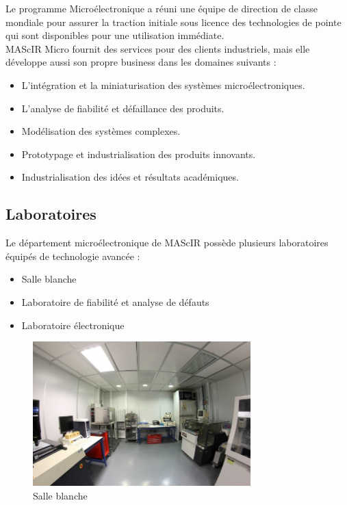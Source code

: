 \documentclass[11pt, a4paper, twoside]{book}
\begin{document}
Le programme Microélectronique a réuni une équipe de direction de classe mondiale pour assurer la traction initiale sous licence des technologies de pointe qui sont disponibles pour une utilisation immédiate. \\

MAScIR Micro fournit des services pour des clients industriels, mais elle développe aussi son propre business dans les domaines suivants :
\begin{itemize}
\item L’intégration et la miniaturisation des systèmes microélectroniques.
\item L’analyse de fiabilité et défaillance des produits.
\item Modélisation des systèmes complexes.
\item Prototypage et industrialisation des produits innovants.
\item Industrialisation des idées et résultats académiques.
\end{itemize}

\subsection{Laboratoires}
Le département microélectronique de MAScIR possède plusieurs laboratoires équipés de technologie avancée :
\begin{itemize}
\item Salle blanche
\item Laboratoire de fiabilité et analyse de défauts
\item Laboratoire électronique
\end{itemize}

\begin{figure}[H]
\centering
\includegraphics[width=0.75\textwidth]{cleanroom}
\caption{Salle blanche}
\end{figure}
\end{document}
